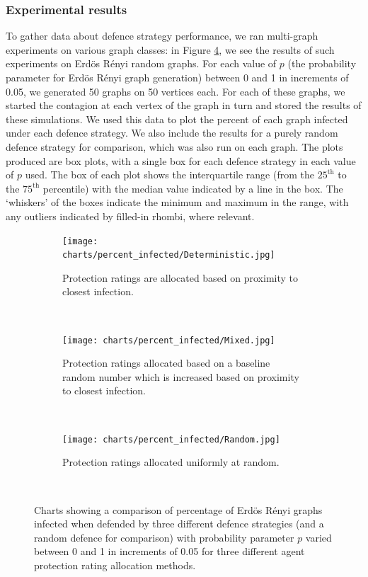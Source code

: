 \documentclass[../report.tex]{subfiles}
\begin{document}
\subsubsection{Experimental results}

To gather data about defence strategy performance, we ran multi-graph experiments on various graph classes: in Figure \ref{fig:plots}, we see the results of such experiments on Erd\"{o}s R\'{e}nyi random graphs. For each value of $p$ (the probability parameter for Erd\"{o}s R\'{e}nyi graph generation) between 0 and 1 in increments of 0.05, we generated 50 graphs on 50 vertices each. For each of these graphs, we started the contagion at each vertex of the graph in turn and stored the results of these simulations. We used this data to plot the percent of each graph infected under each defence strategy. We also include the results for a purely random defence strategy for comparison, which was also run on each graph. The plots produced are box plots, with a single box for each defence strategy in each value of $p$ used. The box of each plot shows the interquartile range (from the $25^\text{th}$ to the $75^\text{th}$ percentile) with the median value indicated by a line in the box. The `whiskers' of the boxes indicate the minimum and maximum in the range, with any outliers indicated by filled-in rhombi, where relevant.

\begin{figure}[!ht] 
  \begin{centering}
    \begin{subfigure}{0.6\linewidth}
      \centering
	  \texttt{[image: charts/percent\_infected/Deterministic.jpg]}
	  \caption{Protection ratings are allocated based on proximity to closest infection.}
    \label{fig:det-result}
    \end{subfigure}\\
    \begin{subfigure}{0.6\linewidth}
      \centering
      \texttt{[image: charts/percent\_infected/Mixed.jpg]}
	  \caption{Protection ratings allocated based on a baseline random number which is increased based on proximity to closest infection.}
    \label{fig:mix-result}
    \end{subfigure}\\
    \begin{subfigure}{0.6\linewidth}
      \centering
      \texttt{[image: charts/percent\_infected/Random.jpg]}
	  \caption{Protection ratings allocated uniformly at random.}
      \label{fig:ran-result}
    \end{subfigure}\\
  \end{centering}
  \caption{Charts showing a comparison of percentage of Erd\"{o}s R\'{e}nyi graphs infected when defended by three different defence strategies (and a random defence for comparison) with probability parameter $p$ varied between 0 and 1 in increments of 0.05  for three different agent protection rating allocation methods.}
\label{fig:plots}
\end{figure}
\end{document}
